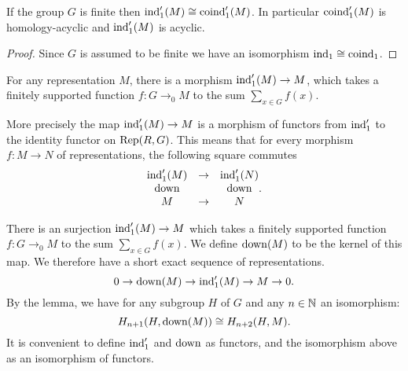 \begin{corollary}
	\label{cor:ind₁' iso coind₁'}
	\leanok
	If the group $G$ is finite then $\mathrm{ind}_1'(M) \cong \mathrm{coind}_1'(M)$.
	In particular $\mathrm{coind}_1'(M)$ is homology-acyclic and $\mathrm{ind}_1'(M)$ is acyclic.
\end{corollary}

\begin{proof}
	Since $G$ is assumed to be finite we have an isomorphism $\mathrm{ind}_1 \cong \mathrm{coind}_1$.
	\leanok
\end{proof}

\begin{definition}
	\label{def:ind₁'_π}
	For any representation $M$, there is a morphism $\mathrm{ind}_1'(M) \to M$,
	which takes a finitely supported function $f : G \to_0 M$ to the sum $\sum_{x \in G} f (x)$.
\end{definition}

\begin{lemma}
	\label{lem:ind₁'_π}
	\leanok
	More precisely the map $\mathrm{ind}_1'(M) \to M$ is a morphism of functors from $\mathrm{ind}_1'$
	to the identity functor on $\mathrm{Rep}(R,G)$.
	This means that for every morphism $f : M \to N$ of representations, the following square
	commutes
	\[
		\begin{matrix}
			\mathrm{ind}_1'(M) & \to & \mathrm{ind}_1'(N) \\
			\mathrm{down} && \mathrm{down} \\
			M & \to &N
		\end{matrix}.
	\]
\end{lemma}

\begin{definition}
	There is an surjection $\mathrm{ind}_1'(M) \to M$ which takes a finitely supported
	function $f : G \to_0 M$ to the sum $\sum_{x \in G} f (x)$.
	We define $\mathrm{down}(M)$ to be the kernel of this map.
	We therefore have a short exact sequence of representations.
	\[
		0 \to \mathrm{down}(M) \to \mathrm{ind}_1'(M) \to M \to 0.
	\]
	By the lemma, we have for any subgroup $H$ of $G$ and any $n \in {\mathbb N}$ an isomorphism:
	\[
		H_{n+1}(H,\mathrm{down}(M)) \cong H_{n+2}(H,M).
	\]
	It is convenient to define $\mathrm{ind}_1'$ and $\mathrm{down}$ as functors, and the isomorphism
	above as an isomorphism of functors.
\end{definition}


